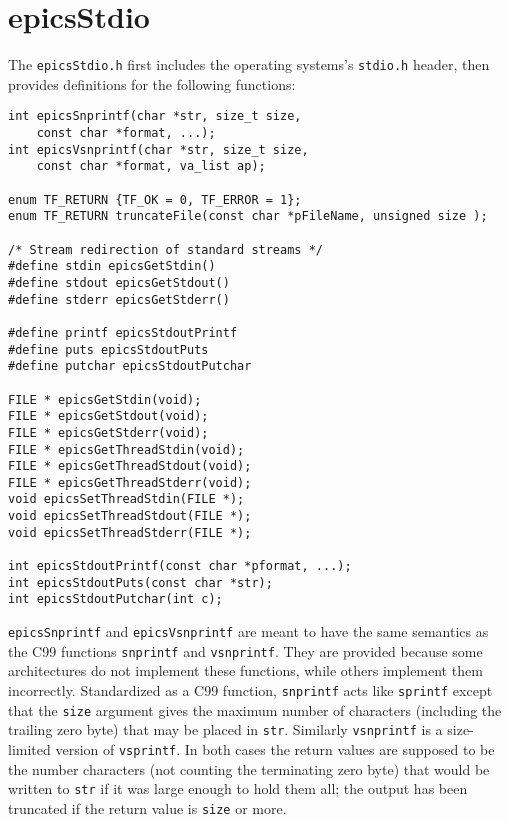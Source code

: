 \section{epicsStdio}

The \verb|epicsStdio.h| first includes the operating systems's \verb|stdio.h| header, then provides definitions for the following functions:

\begin{verbatim}
int epicsSnprintf(char *str, size_t size,
    const char *format, ...);
int epicsVsnprintf(char *str, size_t size,
    const char *format, va_list ap);

enum TF_RETURN {TF_OK = 0, TF_ERROR = 1};
enum TF_RETURN truncateFile(const char *pFileName, unsigned size );

/* Stream redirection of standard streams */
#define stdin epicsGetStdin()
#define stdout epicsGetStdout()
#define stderr epicsGetStderr()

#define printf epicsStdoutPrintf
#define puts epicsStdoutPuts
#define putchar epicsStdoutPutchar

FILE * epicsGetStdin(void);
FILE * epicsGetStdout(void);
FILE * epicsGetStderr(void);
FILE * epicsGetThreadStdin(void);
FILE * epicsGetThreadStdout(void);
FILE * epicsGetThreadStderr(void);
void epicsSetThreadStdin(FILE *);
void epicsSetThreadStdout(FILE *);
void epicsSetThreadStderr(FILE *);

int epicsStdoutPrintf(const char *pformat, ...);
int epicsStdoutPuts(const char *str);
int epicsStdoutPutchar(int c);
\end{verbatim}

\verb|epicsSnprintf| and \verb|epicsVsnprintf| are meant to have the same semantics as the C99 functions \verb|snprintf| and \verb|vsnprintf|.
They are provided because some architectures do not implement these functions, while others implement them incorrectly.
Standardized as a C99 function, \verb|snprintf| acts like \verb|sprintf| except that the \verb|size| argument gives the maximum number of characters (including the trailing zero byte) that may be placed in \verb|str|.
Similarly \verb|vsnprintf| is a size-limited version of \verb|vsprintf|.
In both cases the return values are supposed to be the number characters (not counting the terminating zero byte) that would be written to \verb|str| if it was large enough to hold them all; the output has been truncated if the return value is \verb|size| or more.

